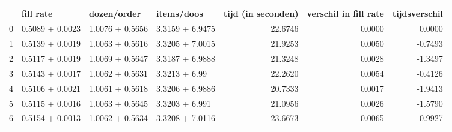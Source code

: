 \begin{tabular}{llllrrr}
\toprule
{} &        fill rate &      dozen/order &       items/doos &  tijd (in seconden) &  verschil in fill rate &  tijdsverschil \\
\midrule
0 &  0.5089 + 0.0023 &  1.0076 + 0.5656 &  3.3159 + 6.9475 &             22.6746 &                 0.0000 &         0.0000 \\
1 &  0.5139 + 0.0019 &  1.0063 + 0.5616 &  3.3205 + 7.0015 &             21.9253 &                 0.0050 &        -0.7493 \\
2 &  0.5117 + 0.0019 &  1.0069 + 0.5647 &  3.3187 + 6.9888 &             21.3248 &                 0.0028 &        -1.3497 \\
3 &  0.5143 + 0.0017 &  1.0062 + 0.5631 &    3.3213 + 6.99 &             22.2620 &                 0.0054 &        -0.4126 \\
4 &  0.5106 + 0.0021 &  1.0061 + 0.5618 &  3.3206 + 6.9886 &             20.7333 &                 0.0017 &        -1.9413 \\
5 &  0.5115 + 0.0016 &  1.0063 + 0.5645 &   3.3203 + 6.991 &             21.0956 &                 0.0026 &        -1.5790 \\
6 &  0.5154 + 0.0013 &  1.0062 + 0.5634 &  3.3208 + 7.0116 &             23.6673 &                 0.0065 &         0.9927 \\
\bottomrule
\end{tabular}
